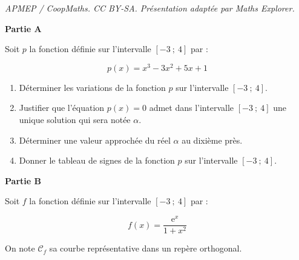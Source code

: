 \documentclass[10pt]{article}
\begin{document}
\noindent\textit{APMEP / CoopMaths. CC BY-SA. Présentation adaptée par Maths Explorer.}\par\medskip
\bigskip

\textbf{Partie A}

\medskip 

Soit $p$ la fonction définie sur l'intervalle $[-3~;~4]$ par :

\[p(x) = x^3 - 3x^2 + 5x + 1\]

\begin{enumerate}
\item Déterminer les variations de la fonction $p$ sur l'intervalle $[-3~;~4]$.
\item Justifier que l'équation $p(x) = 0$ admet dans l'intervalle $[-3~;~4]$ une unique solution qui sera notée $\alpha$.
\item Déterminer une valeur approchée du réel $\alpha$ au dixième près.
\item Donner le tableau de signes de la fonction $p$ sur l'intervalle $[-3~;~4]$. 
\end{enumerate}

\bigskip

\textbf{Partie B}

\medskip 

Soit $f$ la fonction définie sur l'intervalle $[-3~;~4]$ par :

\[f(x) = \dfrac{\text{e}^x}{1 + x^2}\]

On note $\mathcal{C}_f$ sa courbe représentative dans un repère orthogonal.

\medskip
\end{document}
